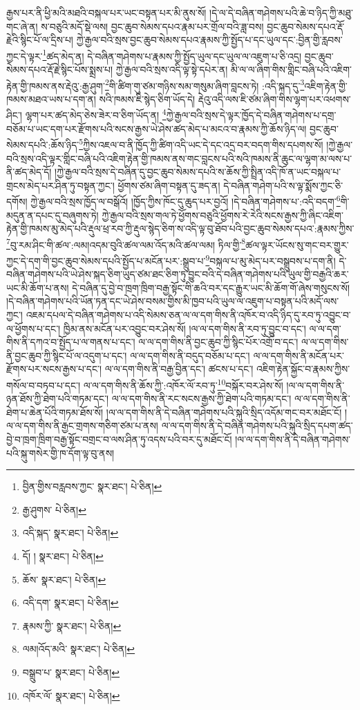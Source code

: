 རྒྱས་པར་ནི་ཕྱི་མའི་མཐའི་བསྐལ་པར་ཡང་བསྟན་པར་མི་ནུས་སོ། །དེ་ལ་དེ་བཞིན་གཤེགས་པའི་ཆེ་བ་ཉིད་ཀྱི་མཐུ་གང་ཞེ་ན། ས་བཅུའི་མདོ་སྡེ་ལས། བྱང་ཆུབ་སེམས་དཔའ་རྣམ་པར་གྲོལ་བའི་ཟླ་བས། བྱང་ཆུབ་སེམས་དཔའ་རྡོ་རྗེའི་སྙིང་པོ་ལ་དྲིས་པ། ཀྱེ་རྒྱལ་བའི་སྲས་བྱང་ཆུབ་སེམས་དཔའ་རྣམས་ཀྱི་སྤྱོད་པ་དང་ཡུལ་དང་:བྱིན་གྱི་རླབས་ཀྱང་དེ་ལྟར་\footnote{བྱིན་གྱིས་བརླབས་ཀྱང་  སྣར་ཐང་།  པེ་ཅིན། }ཚད་མེད་ན། དེ་བཞིན་གཤེགས་པ་རྣམས་ཀྱི་སྤྱོད་ཡུལ་དང་ཡུལ་ལ་འཇུག་པ་ཅི་འདྲ། བྱང་ཆུབ་སེམས་དཔའ་རྡོ་རྗེ་སྙིང་པོས་སྨྲས་པ། ཀྱེ་རྒྱལ་བའི་སྲས་འདི་ལྟ་སྟེ་དཔེར་ན། མི་ལ་ལ་ཞིག་གིས་གླིང་བཞི་པའི་འཇིག་རྟེན་གྱི་ཁམས་ནས་རྡེའུ་:རྒྱ་ཤུག་\footnote{རྒྱ་ཤུགས་  པེ་ཅིན། }གི་ཚིག་གུ་ཙམ་གཉིས་སམ་གསུམ་ཞིག་བླངས་ཏེ། :འདི་སྐད་དུ་\footnote{འདི་སྐད་  སྣར་ཐང་།  པེ་ཅིན། }འཇིག་རྟེན་གྱི་ཁམས་མཐའ་ཡས་པ་དག་ན། སའི་ཁམས་ཇི་སྙེད་ཅིག་ཡོད་དེ། རྡེའུ་འདི་ལས་ཇི་ཙམ་ཞིག་གིས་ལྷག་པར་འཕགས་ཤིང་། ལྷག་པར་ཚད་མེད་ཅེས་ཟེར་བ་ཅིག་ཡོད་ན། \footnote{དོ། །   སྣར་ཐང་།  པེ་ཅིན། }ཀྱེ་རྒྱལ་བའི་སྲས་དེ་ལྟར་ཁྱོད་དེ་བཞིན་གཤེགས་པ་དགྲ་བཅོམ་པ་ཡང་དག་པར་རྫོགས་པའི་སངས་རྒྱས་ཡེ་ཤེས་ཚད་མེད་པ་མངའ་བ་རྣམས་ཀྱི་ཆོས་ཉིད་ལ། བྱང་ཆུབ་སེམས་དཔའི་:ཆོས་ཉིད་\footnote{ཆོས་  སྣར་ཐང་།  པེ་ཅིན། }ཀྱིས་འཇལ་བ་ནི་ཁྱོད་ཀྱི་ཚིག་འདི་ཡང་དེ་དང་འདྲ་བར་བདག་གིས་དཔགས་སོ། །ཀྱེ་རྒྱལ་བའི་སྲས་འདི་ལྟར་གླིང་བཞི་པའི་འཇིག་རྟེན་གྱི་ཁམས་ནས་གང་བླངས་པའི་སའི་ཁམས་ནི་ཆུང་ལ་ལྷག་མ་ལས་པ་ནི་ཚད་མེད་དོ། །ཀྱེ་རྒྱལ་བའི་སྲས་དེ་བཞིན་དུ་བྱང་ཆུབ་སེམས་དཔའི་ས་ཆོས་ཀྱི་སྤྲིན་འདི་ཁོ་ན་ཡང་བསྐལ་པ་གྲངས་མེད་པར་ཤིན་ཏུ་བསྟན་ཀྱང་། ཕྱོགས་ཙམ་ཞིག་བསྟན་དུ་ཟད་ན། དེ་བཞིན་གཤེག་པའི་ས་ལྟ་སྨོས་ཀྱང་ཅི་དགོས། ཀྱེ་རྒྱལ་བའི་སྲས་ཁྱོད་ལ་བསྒོའོ། །ཁྱོད་ཀྱིས་ཁོང་དུ་ཆུད་པར་བྱའོ། །དེ་བཞིན་གཤེགས་པ་:འདི་བདག་\footnote{འདི་དག་  སྣར་ཐང་།  པེ་ཅིན། }གི་མདུན་ན་དཔང་དུ་བཞུགས་ཏེ། ཀྱེ་རྒྱལ་བའི་སྲས་གལ་ཏེ་ཕྱོགས་བཅུའི་ཕྱོགས་རེ་རེའི་སངས་རྒྱས་ཀྱི་ཞིང་འཇིག་རྟེན་གྱི་ཁམས་མུ་མེད་པའི་རྡུལ་ཕྲ་རབ་ཀྱི་རྡུལ་སྙེད་ཅིག་ས་འདི་ལྟ་བུ་ཐོབ་པའི་བྱང་ཆུབ་སེམས་དཔའ་:རྣམས་ཀྱིས་\footnote{རྣམས་ཀྱི་  སྣར་ཐང་།  པེ་ཅིན། }བུ་རམ་ཤིང་གི་ཚལ་:ལམ།འདམ་བུའི་ཚལ་ལམ་འོད་མའི་ཚལ་ལམ། ཏིལ་གྱི་\footnote{ལམ།འོད་མའི་  སྣར་ཐང་།  པེ་ཅིན། }ཚལ་ལྟར་ཡོངས་སུ་གང་བར་གྱུར་ཀྱང་དེ་དག་གི་བྱང་ཆུབ་སེམས་དཔའི་སྤྱོད་པ་མངོན་པར་:སྒྲུབ་པ་\footnote{བསྒྲུབ་པ་  སྣར་ཐང་།  པེ་ཅིན། }བསྐལ་པ་མུ་མེད་པར་བསྒྲུབས་པ་དག་ནི། དེ་བཞིན་གཤེགས་པའི་ཡེ་ཤེས་སྐད་ཅིག་ཡུད་ཙམ་ཐང་ཅིག་ཏུ་བྱུང་བའི་དེ་བཞིན་གཤེགས་པའི་ཡུལ་གྱི་བརྒྱའི་ཆར་ཡང་མི་ཆོག་པ་ནས། དེ་བཞིན་དུ་བྱེ་བ་ཁྲག་ཁྲིག་བརྒྱ་སྟོང་གི་ཆའི་བར་དང་རྒྱུར་ཡང་མི་ཆོག་གོ་ཞེས་གསུངས་སོ། །དེ་བཞིན་གཤེགས་པའི་ཡོན་ཏན་དང་ཡེ་ཤེས་བསམ་གྱིས་མི་ཁྱབ་པའི་ཡུལ་ལ་འཇུག་པ་བསྟན་པའི་མདོ་ལས་ཀྱང་། འཇམ་དཔལ་དེ་བཞིན་གཤེགས་པ་འདི་སེམས་ཅན་ལ་ལ་དག་གིས་ནི་འཁོར་བ་འདི་ཉིད་དུ་རབ་ཏུ་འབྱུང་བ་ལ་ཕྱོགས་པ་དང་། ཁྱིམ་ནས་མངོན་པར་འབྱུང་བར་ཤེས་སོ། །ལ་ལ་དག་གིས་ནི་རབ་ཏུ་བྱུང་བ་དང་། ལ་ལ་དག་གིས་ནི་དཀའ་བ་སྤྱོད་པ་ལ་གནས་པ་དང་། ལ་ལ་དག་གིས་ནི་བྱང་ཆུབ་ཀྱི་སྙིང་པོར་འགྲོ་བ་དང་། ལ་ལ་དག་གིས་ནི་བྱང་ཆུབ་ཀྱི་སྙིང་པོ་ལ་འདུག་པ་དང་། ལ་ལ་དག་གིས་ནི་བདུད་བཅོམ་པ་དང་། ལ་ལ་དག་གིས་ནི་མངོན་པར་རྫོགས་པར་སངས་རྒྱས་པ་དང་། ལ་ལ་དག་གིས་ནི་བརྒྱ་བྱིན་དང་། ཚངས་པ་དང་། འཇིག་རྟེན་སྐྱོང་བ་རྣམས་ཀྱིས་གསོལ་བ་བཏབ་པ་དང་། ལ་ལ་དག་གིས་ནི་ཆོས་ཀྱི་:འཁོར་ལོ་རབ་ཏུ་\footnote{འཁོར་ལོ་  སྣར་ཐང་།  པེ་ཅིན། }བསྐོར་བར་ཤེས་སོ། །ལ་ལ་དག་གིས་ནི་ཉན་ཐོས་ཀྱི་ཐེག་པའི་གཏམ་དང་། ལ་ལ་དག་གིས་ནི་རང་སངས་རྒྱས་ཀྱི་ཐེག་པའི་གཏམ་དང་། ལ་ལ་དག་གིས་ནི་ཐེག་པ་ཆེན་པོའི་གཏམ་ཐོས་སོ། །ལ་ལ་དག་གིས་ནི་དེ་བཞིན་གཤེགས་པའི་སྐུའི་སྲིད་འདོམ་གང་བར་མཐོང་ངོ། །ལ་ལ་དག་གིས་ནི་རྒྱང་གྲགས་གཅིག་ཙམ་པ་ནས། ལ་ལ་དག་གིས་ནི་དེ་བཞིན་གཤེགས་པའི་སྐུའི་སྲིད་དཔག་ཚད་བྱེ་བ་ཁྲག་ཁྲིག་བརྒྱ་སྟོང་བགྲང་བ་ལས་ཤིན་ཏུ་འདས་པའི་བར་དུ་མཐོང་ངོ། །ལ་ལ་དག་གིས་ནི་དེ་བཞིན་གཤེགས་པའི་སྐུ་གསེར་གྱི་ཁ་དོག་ལྟ་བུ་ནས། 